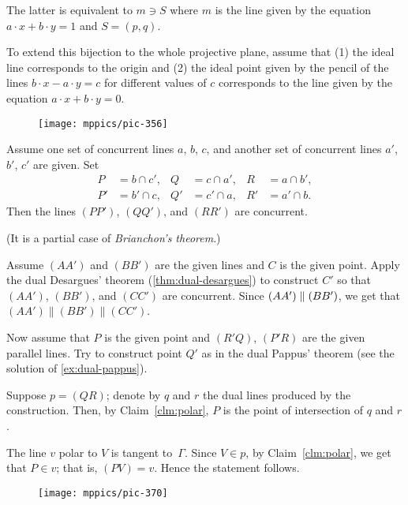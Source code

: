The latter is equivalent to $m\ni S$
where $m$ is the line given by the equation 
$a\cdot x+b\cdot y=1$ and $S=(p,q)$.

To extend this bijection to the whole projective plane, assume that 
(1) the ideal line corresponds to the origin 
and (2) the ideal point given by the pencil of the lines $b\cdot x-a\cdot y=c$ for different values of $c$ corresponds to the line given by the equation $a\cdot x+b\cdot y=0$.

\begin{wrapfigure}{r}{36mm}
\vskip-0mm
\centering
\texttt{[image: mppics/pic-356]}
\vskip-4mm
\end{wrapfigure}

Assume one set of concurrent lines $a$, $b$, $c$, 
and another set of concurrent lines $a'$, $b'$, $c'$ are given.
Set 
\begin{align*}
P&=b\cap c',
&
Q&=c\cap a',
&
R&=a\cap b',\\
P'&=b'\cap c,
&
Q'&=c'\cap a,
&
R'&=a'\cap b.
\end{align*}
Then the lines $(PP')$, $(QQ')$, and $(RR')$ are concurrent.

(It is a partial case of \emph{Brianchon's theorem}.)

Assume $(AA')$ and $(BB')$ are the given lines and $C$ is the given point.
Apply the dual Desargues' theorem (\ref{thm:dual-desargues}) to construct $C'$ so that $(AA')$, $(BB')$, and $(CC')$ are concurrent. 
Since $(AA')\z\parallel (BB')$, 
we get that 
$(AA')\parallel (BB')\parallel (CC')$.

Now assume that $P$ is the given point and $(R'Q)$, $(P'R)$ are the given parallel lines.
Try to construct point $Q'$ as in the dual Pappus' theorem (see the solution of \ref{ex:dual-pappus}).

 Suppose $p=(QR)$; denote by $q$ and $r$ the dual lines produced by the construction. Then, by Claim~\ref{clm:polar}, $P$ is the point of intersection of $q$ and $r$.

The line $v$ polar to $V$ is tangent to~$\Gamma$.
Since $V\in p$, by Claim~\ref{clm:polar}, we get that $P\in v$;
that is, $(PV)=v$.
Hence the statement follows.

\begin{wrapfigure}{r}{45mm}
\vskip-0mm
\centering
\texttt{[image: mppics/pic-370]}
\vskip-6mm
\end{wrapfigure} 


